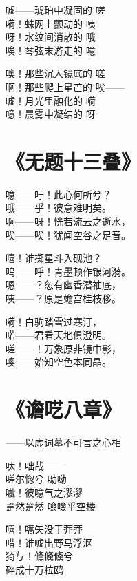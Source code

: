 嘘——琥珀中凝固的 嗟 \\
嗬！蛛网上颤动的 咦 \\
呀！水纹间消散的 哦 \\
唉！琴弦末游走的 噫
\vspace{1em}

噢！那些沉入镜底的 嗟 \\
啊！那些爬上星芒的 唉—— \\
嘘！月光里融化的 嗬 \\
噫！晨雾中凝结的 呀

\clearpage


\section{《无题十三叠》}

噫——吁！此心何所兮？ \\
哦——乎！彼意难明矣。 \\
啊——呀！恍若流云之逝水， \\
唉——唉！犹闻空谷之足音。
\vspace{1em}

嘻！谁掷星斗入砚池？ \\
呜——呼！青墨顿作银河漪。 \\
嗯——？忽有幽香潜袖底， \\
咦——？原是蟾宫桂枝移。
\vspace{1em}

嗬！白驹踏雪过寒汀， \\
喏——君看天地俱澄明。 \\
嗟——！万象原非镜中影， \\
噢——始知空色本同晶。

\clearpage


\section{《谵呓八章》}

——以虚词摹不可言之心相
\vspace{1em}

呔！咄哉—— \\
嗟尔惚兮 呦呦 \\
嚱！彼噫气之漻漻 \\
跫然跫然 噞噞乎空楼
\vspace{1em}

嘻！嚆矢没于莽莽 \\
唶！谁嘘出野马浮沤 \\
猗与！儵儵儵兮 \\
碎成十万粒鸥
\vspace{1em}

